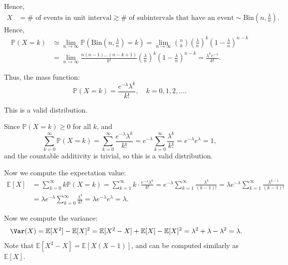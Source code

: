 Hence,
\begin{align*}
    X &= \# \text{ of events in unit interval} \gtrsim \# \text{ of subintervals that have an event} \sim \mathrm{Bin}(n, \frac{\lambda}{n}).   
\end{align*}
Hence,
\begin{align*}
    \mathbb{P} (X = k) &\simeq \lim_{n \to \infty} \mathbb{P} \left( \mathrm{Bin}(n, \frac{\lambda}{n}) = k  \right) = \lim_{n \to \infty} \binom{n}{k} \left( \frac{\lambda}{n} \right)^k \left( 1 - \frac{\lambda}{n} \right)^{n-k} \\
    &= \lim_{n \to \infty} \frac{n(n-1)\dots (n-k+1)}{k!} \left( \frac{\lambda}{n} \right)^k \left( 1 - \frac{\lambda}{n} \right)^{n-k} = \frac{\lambda ^k e^{-\lambda }}{k!}.      
\end{align*}

Thus, the mass function:
\[
    \mathbb{P} (X = k) = \frac{e^{-\lambda } \lambda ^k}{k!}, \quad k = 0, 1, 2, \dots .
\]
\begin{claim}
    This is a valid distribution.
\end{claim}
\begin{explanation}
    Since \(\mathbb{P} (X = k) \ge 0\) for all \(k\), and 
    \[
        \sum_{k=0}^{\infty } \mathbb{P} (X = k) = \sum_{k=0}^{\infty} \frac{e^{-\lambda } \lambda ^k}{k!} = e^{-\lambda } \sum_{k=0}^{\infty} \frac{\lambda ^k}{k!} = e^{-\lambda } e^{\lambda } = 1,   
    \] 
    and the countable additivity is trivial, so this is a valid distribution.
\end{explanation}

Now we compute the expectation value:
\begin{align*}
    \mathbb{E} [X] &= \sum_{k=0}^{\infty} k \mathbb{P} (X = k) = \sum_{k=1}^{\infty} k \cdot \frac{e^{-\lambda } \lambda ^k}{k!} = e^{-\lambda } \sum_{k=1}^{\infty} \frac{\lambda ^k}{(k-1)!} = \lambda e^{-\lambda } \sum_{k=1}^{\infty } \frac{\lambda ^{k-1}}{(k-1)!} \\
    &= \lambda e^{-\lambda } \sum_{k=0}^{\infty} \frac{\lambda ^k}{k!} = \lambda e^{-\lambda } e^{\lambda } = \lambda .      
\end{align*}

Now we compute the variance:
\begin{align*}
    \Var(X) &= \mathbb{E} [X^2] - \mathbb{E} [X]^2 = \mathbb{E} [X^2 - X] + \mathbb{E} [X] - \mathbb{E} [X]^2 = \lambda ^2 + \lambda - \lambda ^2 = \lambda . 
\end{align*}
Note that \(\mathbb{E} [X^2 - X] = \mathbb{E} [X(X - 1)]\), and can be computed similarly as \(\mathbb{E} [X]\). 

